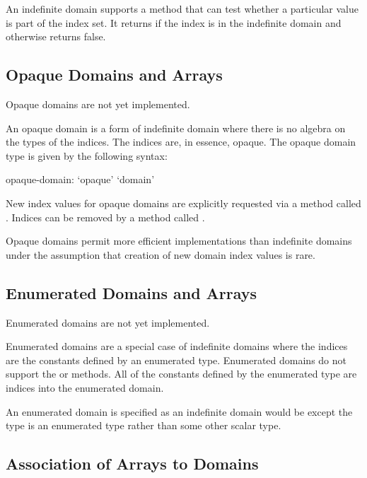 An indefinite domain supports a  method that can test
whether a particular value is part of the index set. It
returns  if the index is in the indefinite domain and
otherwise returns false.

\subsection{Opaque Domains and Arrays}
\label{Opaque_Domains_and_Arrays}

\begin{implementation}
Opaque domains are not yet implemented.
\end{implementation}

An opaque domain is a form of indefinite domain where there is no
algebra on the types of the indices.  The indices are, in essence,
opaque.  The opaque domain type is given by the following syntax:
\begin{syntax}
opaque-domain:
  `opaque' `domain'
\end{syntax}

New index values for opaque domains are explicitly requested via a
method called .  Indices can be removed by a method
called .

Opaque domains permit more efficient implementations than indefinite
domains under the assumption that creation of new domain index values
is rare.

\subsection{Enumerated Domains and Arrays}
\label{Enumerated_Domains_and_Arrays}

\begin{implementation}
Enumerated domains are not yet implemented.
\end{implementation}

Enumerated domains are a special case of indefinite domains where the
indices are the constants defined by an enumerated type.  Enumerated
domains do not support the  or  methods.  All
of the constants defined by the enumerated type are indices into the
enumerated domain.

An enumerated domain is specified as an indefinite domain would be
except the type is an enumerated type rather than some other scalar
type.

\subsection{Association of Arrays to Domains}
\label{Association_of_Arrays_to_Domains}

